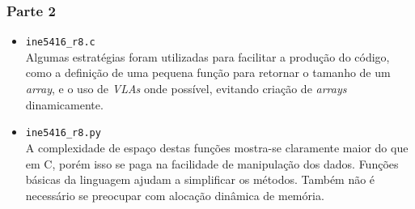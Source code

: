 \documentclass{../sftex/sftex}
\begin{document}
\subsubsection*{Parte 2}
\begin{itemize}
    \item \verb!ine5416_r8.c! \\
    Algumas estratégias foram utilizadas para facilitar a produção do código,
    como a definição de uma pequena função para retornar o tamanho de um
    \emph{array}, e o uso de \emph{VLAs} onde possível, evitando criação
    de \emph{arrays} dinamicamente.

    \item \verb!ine5416_r8.py! \\
    A complexidade de espaço destas funções mostra-se claramente maior do que
    em C, porém isso se paga na facilidade de manipulação dos dados. Funções
    básicas da linguagem ajudam a simplificar os métodos. Também não é
    necessário se preocupar com alocação dinâmica de memória.
\end{itemize}
\end{document}
